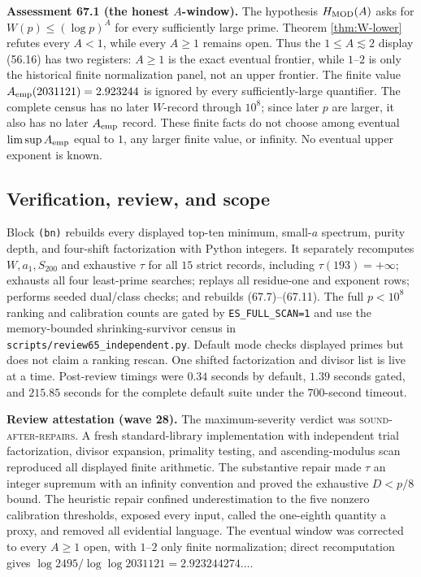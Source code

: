 \documentclass[10pt,reqno]{amsart}
\theoremstyle{definition}
\newcommand{\1}{\mathbf 1}
\begin{document}
\medskip\noindent\textbf{Assessment 67.1 (the honest $A$-window).}
The hypothesis $H_{\rm MOD}(A)$ asks for
$W(p)\leq(\log p)^A$ for every sufficiently large prime.  Theorem
\ref{thm:W-lower} refutes every $A<1$, while every $A\geq1$ remains open.
Thus the $1\leq A\lesssim2$ display (56.16) has two registers: $A\geq1$ is
the exact eventual frontier, while $1$--$2$ is only the historical finite
normalization panel, not an upper frontier.  The finite value
$A_{\rm emp}(2031121)=2.923244$ is ignored by every sufficiently-large
quantifier.  The complete census has no later $W$-record through $10^8$;
since later $p$ are larger, it also has no later $A_{\rm emp}$ record.  These
finite facts do not choose among eventual $\limsup A_{\rm emp}$ equal to
$1$, any larger finite value, or infinity.  No eventual upper exponent is
known.

\subsection{Verification, review, and scope}
Block \texttt{(bn)} rebuilds every displayed top-ten minimum, small-$a$
spectrum, purity depth, and four-shift factorization with Python integers.
It separately recomputes $W,a_1,S_{200}$ and exhaustive $\tau$ for all $15$
strict records, including $\tau(193)=+\infty$; exhausts all four least-prime
searches; replays all residue-one and exponent rows; performs seeded
dual/class checks; and rebuilds (67.7)--(67.11).  The full $p<10^8$ ranking
and calibration counts are gated by \texttt{ES\_FULL\_SCAN=1} and use the
memory-bounded shrinking-survivor census in
\texttt{scripts/review65\_independent.py}.  Default mode checks displayed
primes but does not claim a ranking rescan.  One shifted factorization and
divisor list is live at a time.  Post-review timings were $0.34$ seconds by
default, $1.39$ seconds gated, and $215.85$ seconds for the complete default
suite under the $700$-second timeout.

\medskip\noindent\textbf{Review attestation (wave 28).}
The maximum-severity verdict was \textsc{sound-after-repairs}.  A fresh
standard-library implementation with independent trial factorization,
divisor expansion, primality testing, and ascending-modulus scan reproduced
all displayed finite arithmetic.  The substantive repair made $\tau$ an
integer supremum with an infinity convention and proved the exhaustive
$D<p/8$ bound.  The heuristic repair confined underestimation to the five
nonzero calibration thresholds, exposed every input, called the one-eighth
quantity a proxy, and removed all evidential language.  The eventual window
was corrected to every $A\geq1$ open, with $1$--$2$ only finite
normalization; direct recomputation gives
$\log2495/\log\log2031121=2.923244274\ldots$.
\end{document}
